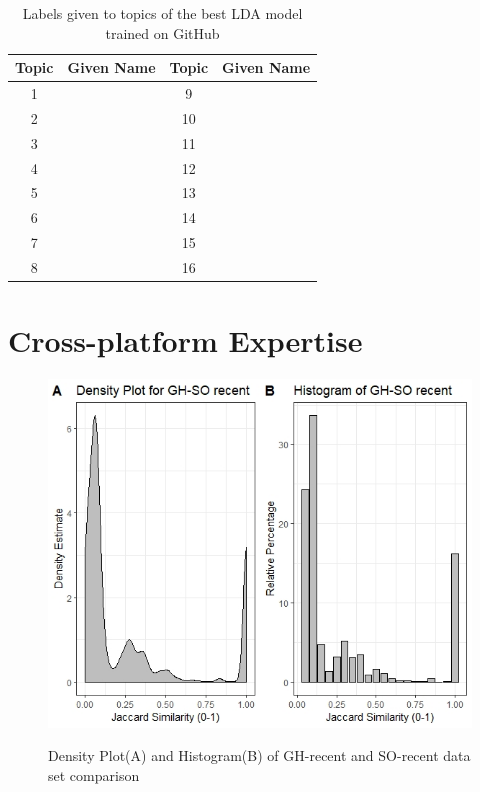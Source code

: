             \begin{table}
              \centering
              \caption{Labels given to topics of the best LDA model trained on GitHub}\label{tab:GH_LDA_labels}
                \vspace{6pt} %
              \begin{tabular}{|c|c|c|c|}
                \hline
                Topic & Given Name & Topic & Given Name \\
                \hline
                1 & & 9 &  \\
                2 & & 10 &  \\
                3 & & 11 &  \\
                4 & & 12 &  \\
                5 & & 13 &  \\
                6 & & 14 &  \\
                7 & & 15 &  \\
                8 & & 16 &  \\
                \hline
              \end{tabular}
            \end{table}
        
    
    \section{Cross-platform Expertise\label{sec:results_rq2}}

        \begin{figure}
          \centering
          \includegraphics[width=\textwidth]{figures/GH_SO_recent.jpeg}\\
          \caption{Density Plot(A) and Histogram(B) of GH-recent and SO-recent data set comparison}
          \label{fig:GH_SO_recent}
        \end{figure}
        
